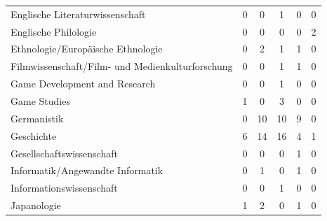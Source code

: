 \documentclass{scrartcl}
\begin{document}
\begin{landscape}
\begin{longtable}{L{7.5cm}ccccc}
Englische Literaturwissenschaft                      & 0                     &  0                       &  1                       & 0                    & 0                       \\
Englische Philologie                                 & 0                     &  0                       &  0                       & 0                    & 2                       \\
Ethnologie/Europäische Ethnologie                    & 0                     &  2                       &  1                       & 1                    & 0                       \\
Filmwissenschaft/Film- und Medienkulturforschung     & 0                     &  0                       &  1                       & 1                    & 0                       \\
Game Development and Research                        & 0                     &  0                       &  1                       & 0                    & 0                       \\
Game Studies                                         & 1                     &  0                       &  3                       & 0                    & 0                       \\
Germanistik                                          & 0                     & 10                       & 10                       & 9                    & 0                       \\
Geschichte                                           & 6                     & 14                       & 16                       & 4                    & 1                       \\
Gesellschaftswissenschaft                            & 0                     &  0                       &  0                       & 1                    & 0                       \\
Informatik/Angewandte Informatik                     & 0                     &  1                       &  0                       & 1                    & 0                       \\
Informationswissenschaft                             & 0                     &  0                       &  1                       & 0                    & 0                       \\
Japanologie                                          & 1                     &  2                       &  0                       & 1                    & 0                       \\

\end{longtable}
\end{landscape}
\end{document}
